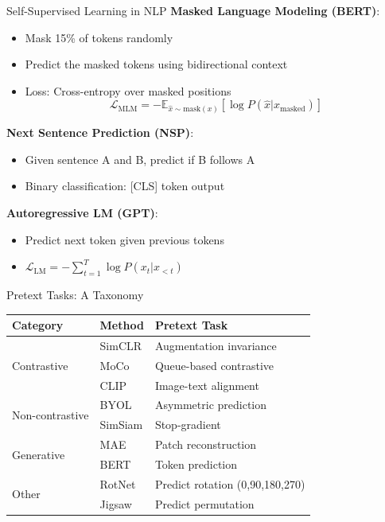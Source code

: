 \documentclass[11pt]{beamer}
\begin{document}
\begin{frame}{Self-Supervised Learning in NLP}
    \textbf{Masked Language Modeling (BERT)}:
    \begin{itemize}
        \item Mask 15\% of tokens randomly
        \item Predict the masked tokens using bidirectional context
        \item Loss: Cross-entropy over masked positions
        \[
            \mathcal{L}_{\text{MLM}} = -\mathbb{E}_{\hat{x} \sim \text{mask}(x)} \left[\log P(\hat{x} | x_{\text{masked}})\right]
        \]
    \end{itemize}
    \vspace{0.5em}
    \textbf{Next Sentence Prediction (NSP)}:
    \begin{itemize}
        \item Given sentence A and B, predict if B follows A
        \item Binary classification: [CLS] token output
    \end{itemize}
    \vfill
    \textbf{Autoregressive LM (GPT)}:
    \begin{itemize}
        \item Predict next token given previous tokens
        \item $\mathcal{L}_{\text{LM}} = -\sum_{t=1}^{T} \log P(x_t | x_{<t})$
    \end{itemize}
\end{frame}

\begin{frame}{Pretext Tasks: A Taxonomy}
    \centering
    \begin{tabular}{lll}
        \toprule
        \textbf{Category} & \textbf{Method} & \textbf{Pretext Task} \\
        \midrule
        \multirow{3}{*}{Contrastive} & SimCLR & Augmentation invariance \\
         & MoCo & Queue-based contrastive \\
         & CLIP & Image-text alignment \\
        \midrule
        \multirow{2}{*}{Non-contrastive} & BYOL & Asymmetric prediction \\
         & SimSiam & Stop-gradient \\
        \midrule
        \multirow{2}{*}{Generative} & MAE & Patch reconstruction \\
         & BERT & Token prediction \\
        \midrule
        \multirow{2}{*}{Other} & RotNet & Predict rotation (0,90,180,270) \\
         & Jigsaw & Predict permutation \\
        \bottomrule
    \end{tabular}
\end{frame}
\end{document}
